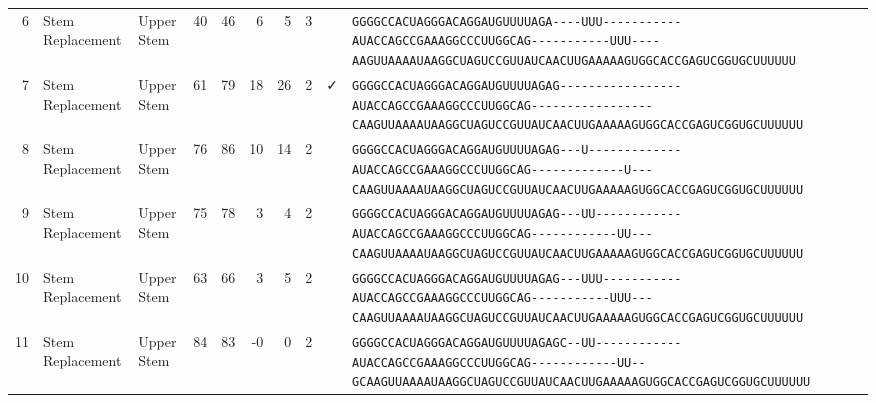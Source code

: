 \begin{tabular}{rllrrrrrcl}
 6 & Stem Replacement & Upper Stem & 40 & 46 & 6 & 5 & 3 &  &
 \color{ucsfblack}\verb|GGGGCCACUAGGGACAGGAU|\color{ucsfblue}\verb|GUUUUAGA----UUU-----------|\color{ucsfpurple}\verb|AUACCAGCCGAAAGGCCCUUGGCAG|\color{ucsfblue}\verb|-----------UUU----AAGUUAAAAU|\color{ucsfnavy}\verb|AAGGCUAGUCCGU|\color{ucsfteal}\verb|UAUCAACUUGAAAAAGUGGCACCGAGUCGGUGC|\color{ucsfblack}\verb|UUUUUU| \\

 7 & Stem Replacement & Upper Stem & 61 & 79 & 18 & 26 & 2 & ✓ &
 \color{ucsfblack}\verb|GGGGCCACUAGGGACAGGAU|\color{ucsfblue}\verb|GUUUUAGAG-----------------|\color{ucsfpurple}\verb|AUACCAGCCGAAAGGCCCUUGGCAG|\color{ucsfblue}\verb|-----------------CAAGUUAAAAU|\color{ucsfnavy}\verb|AAGGCUAGUCCGU|\color{ucsfteal}\verb|UAUCAACUUGAAAAAGUGGCACCGAGUCGGUGC|\color{ucsfblack}\verb|UUUUUU| \\

 8 & Stem Replacement & Upper Stem & 76 & 86 & 10 & 14 & 2 &  &
 \color{ucsfblack}\verb|GGGGCCACUAGGGACAGGAU|\color{ucsfblue}\verb|GUUUUAGAG---U-------------|\color{ucsfpurple}\verb|AUACCAGCCGAAAGGCCCUUGGCAG|\color{ucsfblue}\verb|-------------U---CAAGUUAAAAU|\color{ucsfnavy}\verb|AAGGCUAGUCCGU|\color{ucsfteal}\verb|UAUCAACUUGAAAAAGUGGCACCGAGUCGGUGC|\color{ucsfblack}\verb|UUUUUU| \\

 9 & Stem Replacement & Upper Stem & 75 & 78 & 3 & 4 & 2 &  &
 \color{ucsfblack}\verb|GGGGCCACUAGGGACAGGAU|\color{ucsfblue}\verb|GUUUUAGAG---UU------------|\color{ucsfpurple}\verb|AUACCAGCCGAAAGGCCCUUGGCAG|\color{ucsfblue}\verb|------------UU---CAAGUUAAAAU|\color{ucsfnavy}\verb|AAGGCUAGUCCGU|\color{ucsfteal}\verb|UAUCAACUUGAAAAAGUGGCACCGAGUCGGUGC|\color{ucsfblack}\verb|UUUUUU| \\

 10 & Stem Replacement & Upper Stem & 63 & 66 & 3 & 5 & 2 &  &
 \color{ucsfblack}\verb|GGGGCCACUAGGGACAGGAU|\color{ucsfblue}\verb|GUUUUAGAG---UUU-----------|\color{ucsfpurple}\verb|AUACCAGCCGAAAGGCCCUUGGCAG|\color{ucsfblue}\verb|-----------UUU---CAAGUUAAAAU|\color{ucsfnavy}\verb|AAGGCUAGUCCGU|\color{ucsfteal}\verb|UAUCAACUUGAAAAAGUGGCACCGAGUCGGUGC|\color{ucsfblack}\verb|UUUUUU| \\

 11 & Stem Replacement & Upper Stem & 84 & 83 & -0 & 0 & 2 &  &
 \color{ucsfblack}\verb|GGGGCCACUAGGGACAGGAU|\color{ucsfblue}\verb|GUUUUAGAGC--UU------------|\color{ucsfpurple}\verb|AUACCAGCCGAAAGGCCCUUGGCAG|\color{ucsfblue}\verb|------------UU--GCAAGUUAAAAU|\color{ucsfnavy}\verb|AAGGCUAGUCCGU|\color{ucsfteal}\verb|UAUCAACUUGAAAAAGUGGCACCGAGUCGGUGC|\color{ucsfblack}\verb|UUUUUU| \\


\end{tabular}
